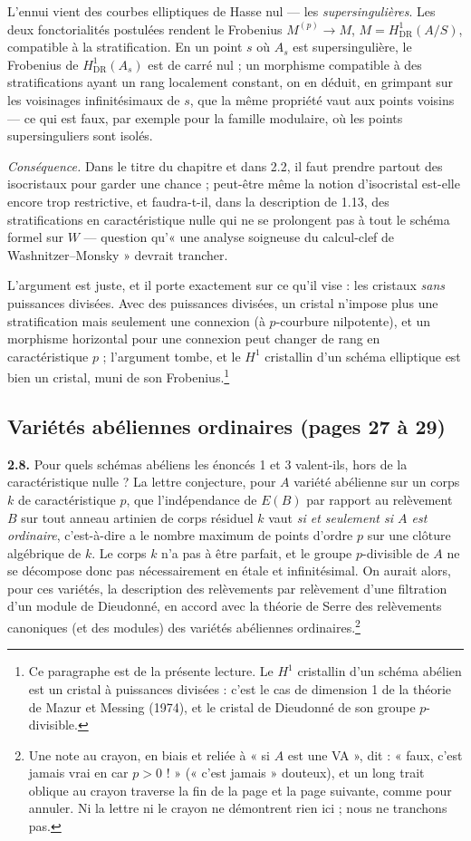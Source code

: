 \documentclass[11pt,a4paper]{article}
\begin{document}
L'ennui vient des courbes elliptiques de Hasse nul — les \emph{supersingulières}.
Les deux fonctorialités postulées rendent le Frobenius
$M^{(p)} \to M$, $M = H^1_{\mathrm{DR}}(A/S)$, compatible à la stratification.
En un point $s$ où $A_s$ est supersingulière, le Frobenius de
$H^1_{\mathrm{DR}}(A_s)$ est de carré nul ; un morphisme compatible à des
stratifications ayant un rang localement constant, on en déduit, en grimpant
sur les voisinages infinitésimaux de $s$, que la même propriété vaut aux points
voisins — ce qui est faux, par exemple pour la famille modulaire, où les points
supersinguliers sont isolés.

\emph{Conséquence.} Dans le titre du chapitre et dans 2.2, il faut prendre
partout des isocristaux pour garder une chance ; peut-être même la notion
d'isocristal est-elle encore trop restrictive, et faudra-t-il, dans la
description de 1.13, des stratifications en caractéristique nulle qui ne se
prolongent pas à tout le schéma formel sur $W$ — question qu'« une analyse
soigneuse du calcul-clef de Washnitzer--Monsky » devrait trancher.

L'argument est juste, et il porte exactement sur ce qu'il vise : les cristaux
\emph{sans} puissances divisées. Avec des puissances divisées, un cristal
n'impose plus une stratification mais seulement une connexion (à
$p$-courbure nilpotente), et un morphisme horizontal pour une connexion peut
changer de rang en caractéristique $p$ ; l'argument tombe, et le $H^1$
cristallin d'un schéma elliptique est bien un cristal, muni de son
Frobenius.\footnote{Ce paragraphe est de la présente lecture. Le $H^1$
cristallin d'un schéma abélien est un cristal à puissances divisées : c'est
le cas de dimension 1 de la théorie de Mazur et Messing (1974), et le
cristal de Dieudonné de son groupe $p$-divisible.}

\subsection*{Variétés abéliennes ordinaires (pages 27 à 29)}

\textbf{2.8.} Pour quels schémas abéliens les énoncés 1 et 3 valent-ils,
hors de la caractéristique nulle ? La lettre conjecture, pour $A$ variété
abélienne sur un corps $k$ de caractéristique $p$, que l'indépendance de $E(B)$
par rapport au relèvement $B$ sur tout anneau artinien de corps résiduel $k$
vaut \emph{si et seulement si $A$ est ordinaire}, c'est-à-dire a le nombre
maximum de points d'ordre $p$ sur une clôture algébrique de $k$. Le corps $k$
n'a pas à être parfait, et le groupe $p$-divisible de $A$ ne se décompose donc
pas nécessairement en étale et infinitésimal. On aurait alors, pour ces
variétés, la description des relèvements par relèvement d'une filtration d'un
module de Dieudonné, en accord avec la théorie de Serre des relèvements
canoniques (et des modules) des variétés abéliennes ordinaires.\footnote{Une note
au crayon, en biais et reliée à « si $A$ est une VA », dit : « faux, c'est
jamais vrai en car $p>0$ ! » (« c'est jamais » douteux), et un long trait
oblique au crayon traverse la fin de la page et la page suivante, comme pour
annuler. Ni la lettre ni le crayon ne démontrent rien ici ; nous ne tranchons
pas.}
\end{document}
